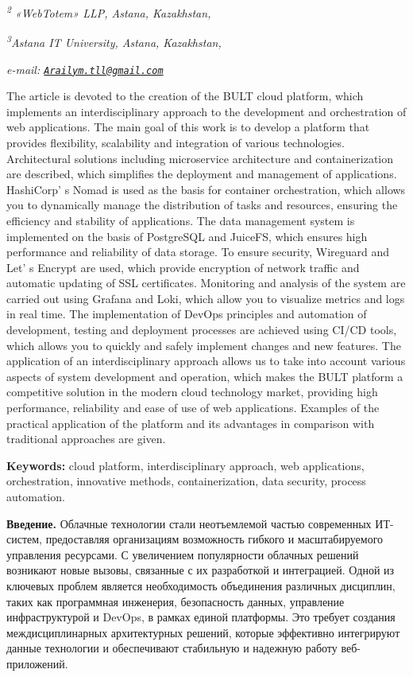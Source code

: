 {\emph{\textsuperscript{2} «WebTotem» LLP, Astana, Kazakhstan,}

\emph{\textsuperscript{3}Astana IT University, Astana, Kazakhstan,}

\emph{e-mail:
\href{mailto:Arailym.tll@gmail.com}{\nolinkurl{Arailym.tll@gmail.com}}}

The article is devoted to the creation of the BULT cloud platform, which
implements an interdisciplinary approach to the development and
orchestration of web applications. The main goal of this work is to
develop a platform that provides flexibility, scalability and
integration of various technologies. Architectural solutions including
microservice architecture and containerization are described, which
simplifies the deployment and management of applications.
HashiCorp' s Nomad is used as the basis for container
orchestration, which allows you to dynamically manage the distribution
of tasks and resources, ensuring the efficiency and stability of
applications. The data management system is implemented on the basis of
PostgreSQL and JuiceFS, which ensures high performance and reliability
of data storage. To ensure security, Wireguard and Let' s
Encrypt are used, which provide encryption of network traffic and
automatic updating of SSL certificates. Monitoring and analysis of the
system are carried out using Grafana and Loki, which allow you to
visualize metrics and logs in real time. The implementation of DevOps
principles and automation of development, testing and deployment
processes are achieved using CI/CD tools, which allows you to quickly
and safely implement changes and new features. The application of an
interdisciplinary approach allows us to take into account various
aspects of system development and operation, which makes the BULT
platform a competitive solution in the modern cloud technology market,
providing high performance, reliability and ease of use of web
applications. Examples of the practical application of the platform and
its advantages in comparison with traditional approaches are given.

{\bfseries Keywords:} cloud platform, interdisciplinary approach, web
applications, orchestration, innovative methods, containerization, data
security, process automation.

{\bfseries Введение.} Облачные технологии стали неотъемлемой частью
современных ИТ-систем, предоставляя организациям возможность гибкого и
масштабируемого управления ресурсами. С увеличением популярности
облачных решений возникают новые вызовы, связанные с их разработкой и
интеграцией. Одной из ключевых проблем является необходимость
объединения различных дисциплин, таких как программная инженерия,
безопасность данных, управление инфраструктурой и DevOps, в рамках
единой платформы. Это требует создания междисциплинарных архитектурных
решений, которые эффективно интегрируют данные технологии и обеспечивают
стабильную и надежную работу веб-приложений.

}
